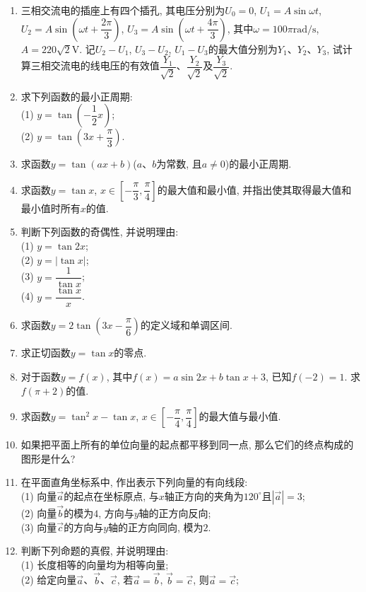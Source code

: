 \documentclass[10pt,a4paper]{article}
\begin{document}
\begin{enumerate}[1.]
\begin{center}
\begin{tikzpicture}[>=latex,scale = 0.5]
\end{tikzpicture}
\end{center}
\item 三相交流电的插座上有四个插孔, 其电压分别为$U_0=0$, $U_1=A\sin \omega t$, $U_2=A\sin (\omega t+\dfrac{2\pi} 3)$, $U_3=A\sin (\omega t+\dfrac{4\pi} 3)$, 其中$\omega =100\pi\text{rad}/\text{s}$, $A=220\sqrt 2\text{V}$. 记$U_2-U_1$, $U_3-U_2$, $U_1-U_3$的最大值分别为$Y_1$、$Y_2$、$Y_3$, 试计算三相交流电的线电压的有效值$\dfrac{Y_1}{\sqrt 2}$、$\dfrac{Y_2}{\sqrt 2}$及$\dfrac{Y_3}{\sqrt 2}$.
\item 求下列函数的最小正周期:\\
(1) $y=\tan (-\dfrac 12x)$;\\
(2) $y=\tan (3x+\dfrac \pi 3)$.
\item 求函数$y=\tan (ax+b)$($a$、$b$为常数, 且$a\ne 0$)的最小正周期.
\item 求函数$y=\tan x$, $x\in  [-\dfrac \pi 3, \dfrac \pi 4]$的最大值和最小值, 并指出使其取得最大值和最小值时所有$x$的值.
\item 判断下列函数的奇偶性, 并说明理由:\\
(1) $y=\tan 2x$;\\
(2) $y=|\tan x|$;\\
(3) $y= \dfrac 1{\tan x}$;\\
(4) $y=\dfrac{\tan x}x$.
\item 求函数$y=2\tan (3x-\dfrac \pi 6)$的定义域和单调区间.
\item 求正切函数$y=\tan x$的零点.
\item 对于函数$y=f(x)$, 其中$f(x)=a\sin 2x+b\tan x+3$, 已知$f(-2)=1$. 求$f(\pi +2)$的值.
\item 求函数$y=\tan^2 x-\tan x$, $x\in  [-\dfrac \pi 4, \dfrac \pi 4]$的最大值与最小值.
\item 如果把平面上所有的单位向量的起点都平移到同一点, 那么它们的终点构成的图形是什么?
\item 在平面直角坐标系中, 作出表示下列向量的有向线段:\\
(1) 向量$\overrightarrow a$的起点在坐标原点, 与$x$轴正方向的夹角为$120^\circ$且$|\overrightarrow a|=3$;\\
(2) 向量$\overrightarrow b$的模为$4$, 方向与$y$轴的正方向反向;\\
(3) 向量$\overrightarrow c$的方向与$y$轴的正方向同向, 模为$2$.
\item 判断下列命题的真假, 并说明理由:\\
(1) 长度相等的向量均为相等向量;\\
(2) 给定向量$\overrightarrow a$、$\overrightarrow b$、$\overrightarrow c$, 若$\overrightarrow a=\overrightarrow b$, $\overrightarrow b=\overrightarrow c$, 则$\overrightarrow a=\overrightarrow c$;\\

\end{enumerate}
\end{document}

